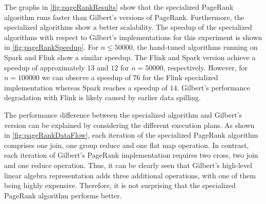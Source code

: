 The graphs in \cref{fig:pageRankResults} show that the specialized PageRank algorithm runs faster than Gilbert's versions of PageRank.
Furthermore, the specialized algorithms show a better scalability.
The speedup of the specialized algorithms with respect to Gilbert's implementations for this experiment is shown in \cref{fig:pageRankSpeedup}.
For $n\le 50000$, the hand-tuned algorithms running on Spark and Flink show a similar speedup.
The Flink and Spark version achieve a speedup of approximately $13$ and $12$ for $n=50000$, respectively.
However, for $n = 100000$ we can observe a speedup of $76$ for the Flink specialized implementation whereas Spark reaches a speedup of $14$.
Gilbert's performance degradation with Flink is likely caused by earlier data spilling.

The performance difference between the specialized algorithm and Gilbert's version can be explained by considering the different execution plans.
As shown in \cref{fig:pageRankDataFlow}, each iteration of the specialized PageRank algorithm comprises one join, one group reduce and one flat map operation.
In contrast, each iteration of Gilbert's PageRank implementation requires two cross, two join and one reduce operation.
Thus, it can be clearly seen that Gilbert's high-level linear algebra representation adds three additional operations, with one of them being highly expensive.
Therefore, it is not surprising that the specialized PageRank algorithm performs better.